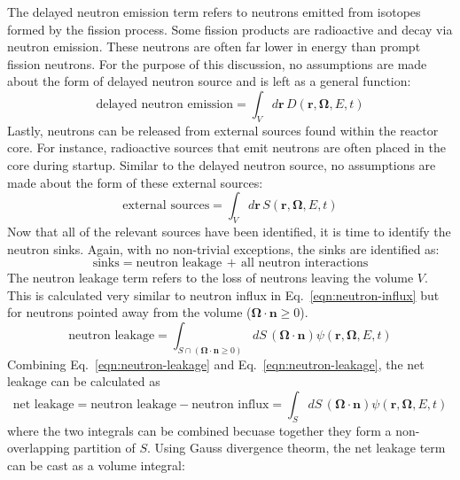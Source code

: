 The delayed neutron emission term refers to neutrons emitted from isotopes formed by the fission process. Some fission products are radioactive and decay via neutron emission. These neutrons are often far lower in energy than prompt fission neutrons. For the purpose of this discussion, no assumptions are made about the form of delayed neutron source and is left as a general function:
\begin{equation}
\text{delayed neutron emission} = \int_V d\mathbf{r} \, D(\mathbf{r}, \mathbf{\Omega}, E, t)
\end{equation}
Lastly, neutrons can be released from external sources found within the reactor core. For instance, radioactive sources that emit neutrons are often placed in the core during startup. Similar to the delayed neutron source, no assumptions are made about the form of these external sources:
\begin{equation}
\text{external sources} = \int_V d\mathbf{r} \, S(\mathbf{r}, \mathbf{\Omega}, E, t)
\end{equation}
Now that all of the relevant sources have been identified, it is time to identify the neutron sinks. Again, with no non-trivial exceptions, the sinks are identified as:
\begin{equation}
\text{sinks} = \text{neutron leakage} \, + \, \text{all neutron interactions}
\end{equation}
The neutron leakage term refers to the loss of neutrons leaving the volume $V$. This is calculated very similar to neutron influx in Eq.~\ref{eqn:neutron-influx} but for neutrons pointed away from the volume ($\mathbf{\Omega} \cdot \mathbf{n} \geq 0$).
\begin{equation}
\text{neutron leakage} = \int_{S \cap \left(\mathbf{\Omega} \cdot \mathbf{n} \geq 0 \right)} dS \, \left(\mathbf{\Omega} \cdot \mathbf{n} \right) \psi(\mathbf{r}, \mathbf{\Omega}, E, t)
\label{eqn:neutron-leakage}
\end{equation}
Combining Eq.~\ref{eqn:neutron-leakage} and Eq.~\ref{eqn:neutron-leakage}, the net leakage can be calculated as
\begin{equation}
\text{net leakage} = \text{neutron leakage} - \text{neutron influx} = \int_{S} dS \, \left(\mathbf{\Omega} \cdot \mathbf{n} \right) \psi(\mathbf{r}, \mathbf{\Omega}, E, t)
\label{eqn:net-leakage-surf}
\end{equation}
where the two integrals can be combined becuase together they form a non-overlapping partition of $S$. Using Gauss divergence theorm, the net leakage term can be cast as a volume integral:
